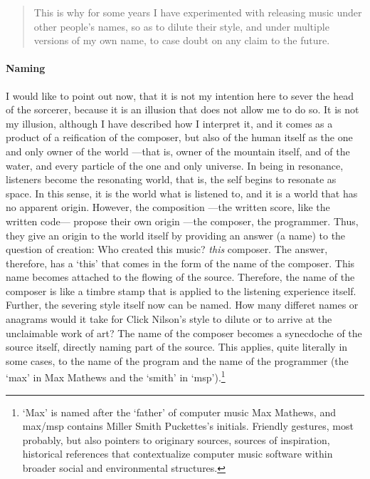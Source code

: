 \begin{quote}
	This is why for some years I have experimented with releasing music under other people's names, so as to dilute their style, and under multiple versions of my own name, to case doubt on any claim to the future. \parencite{Col15:Col}
\end{quote}

\paragraph{Naming}
I would like to point out now, that it is not my intention here to sever the head of the sorcerer, because it is an illusion that does not allow me to do so. It is not my illusion, although I have described how I interpret it, and it comes as a product of a reification of the composer, but also of the human itself as the one and only owner of the world ---that is, owner of the mountain itself, and of the water, and every particle of the one and only universe. In being in resonance, listeners become the resonating world, that is, the self begins to resonate as space. In this sense, it is the world what is listened to, and it is a world that has no apparent origin. However, the composition ---the written score, like the written code--- propose their own origin ---the composer, the programmer. Thus, they give an origin to the world itself by providing an answer (a name) to the question of creation: Who created this music? \textit{this} composer. The answer, therefore, has a `this' that comes in the form of the name of the composer. This name becomes attached to the flowing of the source. Therefore, the name of the composer is like a timbre stamp that is applied to the listening experience itself. Further, the severing style itself now can be named. How many differet names or anagrams would it take for Click Nilson's style to dilute or to arrive at the unclaimable work of art? The name of the composer becomes a synecdoche of the source itself, directly naming part of the source. This applies, quite literally in some cases, to the name of the program and the name of the programmer (the `max' in Max Mathews and the `smith' in `msp').\footnote{`Max' is named after the `father' of computer music Max Mathews, and \gls{max/msp} contains Miller Smith Puckettes's initials. Friendly gestures, most probably, but also pointers to originary sources, sources of inspiration, historical references that contextualize computer music software within broader social and environmental structures.}

